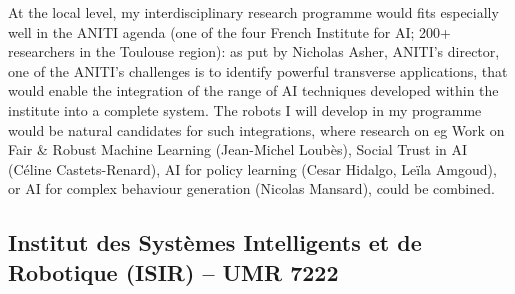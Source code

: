 At the local level, my interdisciplinary research programme would fits
especially well in the ANITI agenda (one of the four French Institute for AI;
200+ researchers in the Toulouse region): as put by Nicholas Asher, ANITI's
director, one of the ANITI's challenges is to identify powerful transverse
applications, that would enable the integration of the range of AI techniques
developed within the institute into a complete system. The robots I will develop
in my programme would be natural candidates for such integrations, where
research on eg Work on Fair \& Robust Machine Learning (Jean-Michel Loubès),
Social Trust in AI (Céline Castets-Renard), AI for policy learning (Cesar
Hidalgo, Leïla Amgoud), or AI for complex behaviour generation (Nicolas
Mansard), could be combined.

%
%
%
%
%
%
%
%
%
%

\subsection{Institut des Systèmes Intelligents et de Robotique (ISIR) -- UMR 7222}

